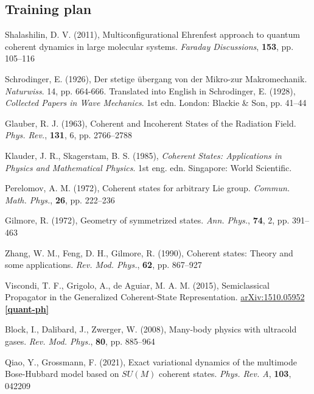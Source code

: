 \documentclass[12pt]{article}
\begin{document}
	\subsection{Training plan}
	
	
	
	
	\begin{thebibliography}{10}

	Shalashilin, D. V. (2011), Multiconfigurational Ehrenfest approach to quantum coherent dynamics in large molecular systems. \textit{Faraday Discussions}, \textbf{153}, pp. 105--116
	
	Schrodinger, E. (1926), Der stetige übergang von der Mikro-zur Makromechanik. \textit{Naturwiss}. 14, pp. 664-666. Translated into English in Schrodinger, E. (1928), \textit{Collected Papers in Wave Mechanics}. 1st edn. London: Blackie \& Son, pp. 41--44
	
	Glauber, R. J. (1963), Coherent and Incoherent States of the Radiation Field. \textit{Phys. Rev.}, \textbf{131}, 6, pp. 2766--2788
	
	Klauder, J. R., Skagerstam, B. S. (1985), \textit{Coherent States: Applications in Physics and Mathematical Physics}. 1st eng. edn. Singapore: World Scientific.
	
	Perelomov, A. M. (1972), Coherent states for arbitrary Lie group. \textit{Commun. Math. Phys.}, \textbf{26}, pp. 222--236
	
	Gilmore, R. (1972), Geometry of symmetrized states. \textit{Ann. Phys.}, \textbf{74}, 2, pp. 391--463
	
	Zhang, W. M., Feng, D. H., Gilmore, R. (1990), Coherent states: Theory and some applications. \textit{Rev. Mod. Phys.}, \textbf{62}, pp. 867--927
	
	Viscondi, T. F., Grigolo, A., de Aguiar, M. A. M. (2015), Semiclassical Propagator in the Generalized Coherent-State Representation. \href{https://doi.org/10.48550/arXiv.1510.05952}{arXiv:1510.05952 \textbf{[quant-ph]}}
	
	Block, I., Dalibard, J., Zwerger, W. (2008), Many-body physics with ultracold gases. \textit{Rev. Mod. Phys.}, \textbf{80}, pp. 885--964
	
	Qiao, Y., Grossmann, F. (2021), Exact variational dynamics of the multimode Bose-Hubbard model based on $SU(M)$ coherent states. \textit{Phys. Rev. A}, \textbf{103}, 042209
	

\end{thebibliography}
\end{document}
